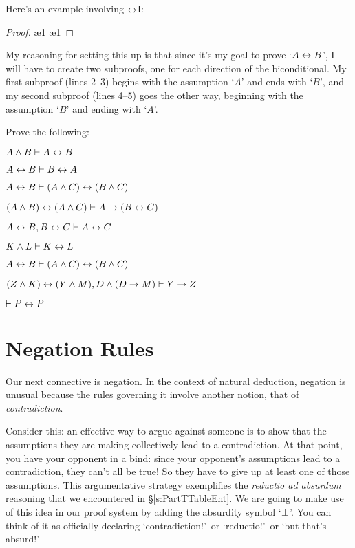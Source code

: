 Here's an example involving $\leftrightarrow$I:


\begin{proof}
 
\open
{}  
 \ae{1}
\close
\open
{} 
 \ae{1}
\close
{} 
\end{proof}

My reasoning for setting this up is that since it's my goal to prove `$A \leftrightarrow B$', I will have to create two subproofs, one for each direction of the biconditional. My first subproof (lines 2--3) begins with the assumption `$A$' and ends with `$B$', and my second subproof (lines 4--5) goes the other way, beginning with the assumption `$B$' and ending with `$A$'.

\practiceproblems

\problempart
Prove the following:

\begin{earg}
\item $A \wedge B \vdash A \leftrightarrow B$
\item $A \leftrightarrow B \vdash B \leftrightarrow A$
\item $A \leftrightarrow B \vdash (A \wedge C) \leftrightarrow (B \wedge C)$
\item $(A \wedge B) \leftrightarrow (A \wedge C) \vdash A \rightarrow (B \leftrightarrow C)$
\item $A\leftrightarrow B, B\leftrightarrow C \vdash A\leftrightarrow C$
\item $K \wedge L \vdash K \leftrightarrow L$
\item $A \leftrightarrow B \vdash (A \wedge C) \leftrightarrow (B \wedge C)$
\item $(Z\wedge K)\leftrightarrow(Y\wedge M), D\wedge(D\rightarrow M) \vdash Y\rightarrow Z$
\item $\vdash P \leftrightarrow P$
\end{earg}





\section{Negation Rules}



Our next connective is negation. In the context of natural deduction, negation is unusual because the rules governing it involve another notion, that of  \emph{contradiction}.

Consider this: an effective way to argue against someone is to show that the assumptions they are making collectively lead to a contradiction.  At that point, you have your opponent in a bind: since your opponent's assumptions lead to a contradiction, they can't all be true! So they have to give up at least one of those assumptions. This argumentative strategy exemplifies the \emph{reductio ad absurdum} reasoning that we encountered in \S\ref{s:PartTTableEnt}.  We are going to make use of this idea in our proof system by adding the absurdity symbol `$\bot$'.  You can think of it as officially declaring `contradiction!'\ or `reductio!'\ or `but that's absurd!'

